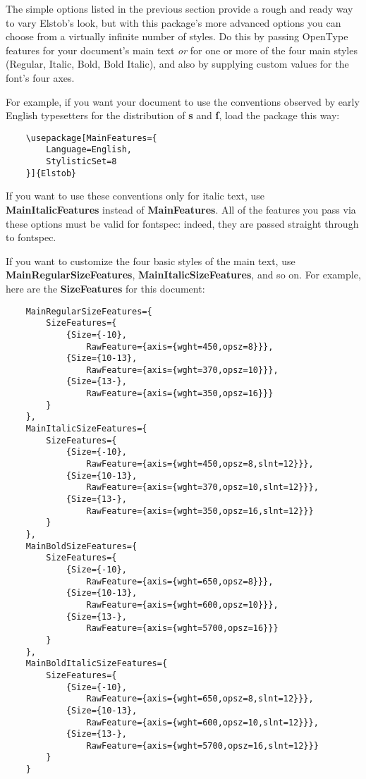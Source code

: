 \documentclass[12pt]{article}
\newcommand{\fspec}{{\sffamily fontspec}}
\begin{document}
The simple options listed in the previous section provide a rough and ready
way to vary Elstob's look, but with this package's more advanced options you can choose
from a virtually infinite number of styles. Do this by passing OpenType features 
for your document's main text \emph{or} for one or more of the four main styles
(Regular, Italic, Bold, Bold Italic), and also by supplying custom values for the
font's four axes.

For example, if you want your document to use the conventions observed by early
English typesetters for the distribution of \textbf{s} and \textbf{ſ}, load the
package this way:

\footnotesize
\begin{verbatim}
    \usepackage[MainFeatures={
        Language=English,
        StylisticSet=8
    }]{Elstob}
\end{verbatim}
\normalsize

\noindent If you want to use these conventions only for italic text, use
\textbf{MainItalicFeatures} instead of \textbf{MainFeatures}. All of the
features you pass via these options must be valid for \fspec: indeed,
they are passed straight through to \fspec.

If you want to customize the four basic styles of the main text, use
\textbf{MainRegularSizeFeatures}, \textbf{MainItalicSizeFeatures}, and so on.
For example, here are the \textbf{SizeFeatures} for this document:

\footnotesize
\begin{verbatim}
    MainRegularSizeFeatures={
        SizeFeatures={
            {Size={-10},
                RawFeature={axis={wght=450,opsz=8}}},
            {Size={10-13},
                RawFeature={axis={wght=370,opsz=10}}},
            {Size={13-},
                RawFeature={axis={wght=350,opsz=16}}}
        }
    },
    MainItalicSizeFeatures={
        SizeFeatures={
            {Size={-10},
                RawFeature={axis={wght=450,opsz=8,slnt=12}}},
            {Size={10-13},
                RawFeature={axis={wght=370,opsz=10,slnt=12}}},
            {Size={13-},
                RawFeature={axis={wght=350,opsz=16,slnt=12}}}
        }
    },
    MainBoldSizeFeatures={
        SizeFeatures={
            {Size={-10},
                RawFeature={axis={wght=650,opsz=8}}},
            {Size={10-13},
                RawFeature={axis={wght=600,opsz=10}}},
            {Size={13-},
                RawFeature={axis={wght=5700,opsz=16}}}
        }
    },
    MainBoldItalicSizeFeatures={
        SizeFeatures={
            {Size={-10},
                RawFeature={axis={wght=650,opsz=8,slnt=12}}},
            {Size={10-13},
                RawFeature={axis={wght=600,opsz=10,slnt=12}}},
            {Size={13-},
                RawFeature={axis={wght=5700,opsz=16,slnt=12}}}
        }
    }
\end{verbatim}\normalsize
\end{document}
